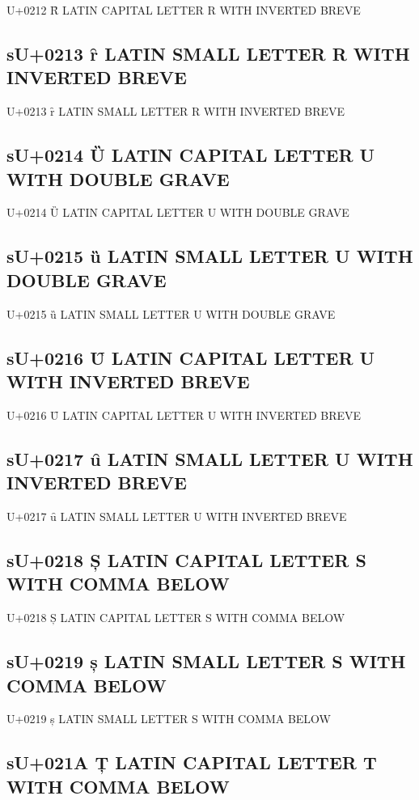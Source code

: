 U+0212 Ȓ LATIN CAPITAL LETTER R WITH INVERTED BREVE

\subsection{sU+0213 ȓ LATIN SMALL LETTER R WITH INVERTED BREVE}

U+0213 ȓ LATIN SMALL LETTER R WITH INVERTED BREVE

\subsection{sU+0214 Ȕ LATIN CAPITAL LETTER U WITH DOUBLE GRAVE}

U+0214 Ȕ LATIN CAPITAL LETTER U WITH DOUBLE GRAVE

\subsection{sU+0215 ȕ LATIN SMALL LETTER U WITH DOUBLE GRAVE}

U+0215 ȕ LATIN SMALL LETTER U WITH DOUBLE GRAVE

\subsection{sU+0216 Ȗ LATIN CAPITAL LETTER U WITH INVERTED BREVE}

U+0216 Ȗ LATIN CAPITAL LETTER U WITH INVERTED BREVE

\subsection{sU+0217 ȗ LATIN SMALL LETTER U WITH INVERTED BREVE}

U+0217 ȗ LATIN SMALL LETTER U WITH INVERTED BREVE

\subsection{sU+0218 Ș  LATIN CAPITAL LETTER S WITH COMMA BELOW}

U+0218 Ș  LATIN CAPITAL LETTER S WITH COMMA BELOW

\subsection{sU+0219 ș  LATIN SMALL LETTER S WITH COMMA BELOW}

U+0219 ș  LATIN SMALL LETTER S WITH COMMA BELOW

\subsection{sU+021A Ț  LATIN CAPITAL LETTER T WITH COMMA BELOW}

